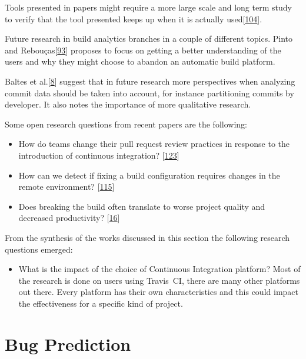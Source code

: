 \documentclass[]{book}
\providecommand{\tightlist}{%
  \setlength{\itemsep}{0pt}\setlength{\parskip}{0pt}}
\begin{document}
Tools presented in papers might require a more large scale and long term
study to verify that the tool presented keeps up when it is actually
used{[}\protect\hyperlink{ref-santolucito2018statically}{104}{]}.

Future research in build analytics branches in a couple of different
topics. Pinto and
Rebouças{[}\protect\hyperlink{ref-pinto2018work}{93}{]} proposes to
focus on getting a better understanding of the users and why they might
choose to abandon an automatic build platform.

Baltes et al.{[}\protect\hyperlink{ref-baltes2018no}{8}{]} suggest that
in future research more perspectives when analyzing commit data should
be taken into account, for instance partitioning commits by developer.
It also notes the importance of more qualitative research.

Some open research questions from recent papers are the following:

\begin{itemize}
\tightlist
\item
  How do teams change their pull request review practices in response to
  the introduction of continuous integration?
  {[}\protect\hyperlink{ref-zhao2017impact}{123}{]}
\item
  How can we detect if fixing a build configuration requires changes in
  the remote environment?
  {[}\protect\hyperlink{ref-vassallo2018break}{115}{]}
\item
  Does breaking the build often translate to worse project quality and
  decreased productivity?
  {[}\protect\hyperlink{ref-beller2017oops}{16}{]}
\end{itemize}

From the synthesis of the works discussed in this section the following
research questions emerged:

\begin{itemize}
\tightlist
\item
  What is the impact of the choice of Continuous Integration platform?
  Most of the research is done on users using Travis~CI, there are many
  other platforms out there. Every platform has their own
  characteristics and this could impact the effectiveness for a specific
  kind of project.
\end{itemize}

\chapter{Bug Prediction}\label{bug-prediction}
\end{document}
